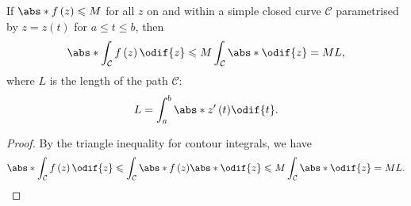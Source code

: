 \documentclass{article}
\begin{document}
\begin{corollary}
    If \(\abs*{f\left( z \right)} \leqslant M\) for all \(z\) on and
    within a simple closed curve \(\mathcal{C}\) parametrised by
    \(z = z\left( t \right)\) for \(a \leqslant t \leqslant b\), then
    \begin{equation*}
        \abs*{\int_{\mathcal{C}} f\left( z \right) \odif{z}} \leqslant M \int_{\mathcal{C}} \abs*{\odif{z}} = M L,
    \end{equation*}
    where \(L\) is the length of the path \(\mathcal{C}\):
    \begin{equation*}
        L = \int_a^b \abs*{z'\left( t \right)} \odif{t}.
    \end{equation*}
\end{corollary}
\begin{proof}
    By the triangle inequality for contour integrals, we have
    \begin{equation*}
        \abs*{\int_{\mathcal{C}} f\left( z \right) \odif{z}} \leqslant \int_{\mathcal{C}} \abs*{f\left( z \right)} \abs*{\odif{z}} \leqslant M \int_{\mathcal{C}} \abs*{\odif{z}} = M L.
    \end{equation*}
\end{proof}
\end{document}
